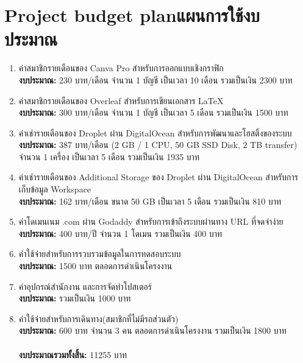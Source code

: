 \section{\ifenglish Project budget plan\else แผนการใช้งบประมาณ\fi}
\begin{enumerate}
    \item ค่าสมาชิกรายเดือนของ Canva Pro สำหรับการออกแบบเชิงกราฟิก\\
    \textbf{งบประมาณ:} 230 บาท/เดือน จำนวน 1 บัญชี เป็นเวลา 10 เดือน รวมเป็นเงิน 2300 บาท
    \item ค่าสมาชิกรายเดือนของ Overleaf สำหรับการเขียนเอกสาร \LaTeX \\
    \textbf{งบประมาณ:} 300 บาท/เดือน จำนวน 1 บัญชี เป็นเวลา 5 เดือน รวมเป็นเงิน 1500 บาท
    \item ค่าเช่ารายเดือนของ Droplet ผ่าน DigitalOcean สำหรับการพัฒนาและโฮสติ้งของระบบ\\
    \textbf{งบประมาณ:} 387 บาท/เดือน (2 GB / 1 CPU, 50 GB SSD Disk, 2 TB transfer) \\
    จำนวน 1 เครื่อง เป็นเวลา 5 เดือน รวมเป็นเงิน 1935 บาท
    \item ค่าเช่ารายเดือนของ Additional Storage ของ Droplet ผ่าน DigitalOcean สำหรับการ\\
    เก็บข้อมูล Workspace\\
    \textbf{งบประมาณ:} 162 บาท/เดือน ขนาด 50 GB เป็นเวลา 5 เดือน รวมเป็นเงิน 810 บาท
    \item ค่าโดเมนเนม .com ผ่าน Godaddy สำหรับการเข้าถึงระบบผ่านทาง URL ที่จดจำง่าย\\
    \textbf{งบประมาณ:} 400 บาท/ปี จำนวน 1 โดเมน รวมเป็นเงิน 400 บาท
    \item ค่าใช้จ่ายสำหรับการรวบรวมข้อมูลในการทดสอบระบบ\\
    \textbf{งบประมาณ:} 1500 บาท ตลอดการดำเนินโครงงาน
    \item ค่าอุปกรณ์สำนักงาน และการจัดทำโปสเตอร์\\
    \textbf{งบประมาณ:} รวมเป็นเงิน 1000 บาท
    \item ค่าใช้จ่ายสำหรับการเดินทาง(สมาชิกที่ไม่มีรถส่วนตัว)\\
    \textbf{งบประมาณ:} 600 บาท จำนวน 3 คน ตลอดการดำเนินโครงงาน รวมเป็นเงิน 1800 บาท\\ \\
    \textbf{งบประมาณรวมทั้งสิ้น:} 11255 บาท

\end{enumerate}